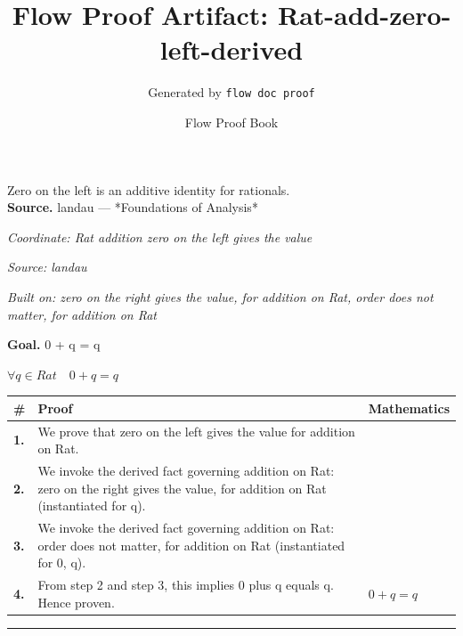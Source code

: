 \documentclass[11pt]{article}
\title{Flow Proof Artifact: Rat-add-zero-left-derived}
\author{Generated by \texttt{flow doc proof}}
\date{Flow Proof Book}
\theoremstyle{definition}
\begin{document}
\maketitle
Zero on the left is an additive identity for rationals.\\[0.5em]
\textbf{Source.} landau — *Foundations of Analysis*\\[0.5em]
\bigskip
{}\par
\smallskip\noindent\textit{Coordinate: Rat \cdot addition \cdot zero on the left gives the value}\par
\smallskip\noindent\textit{Source: landau}\par
\smallskip\noindent\textit{Built on: zero on the right gives the value, for addition on Rat, order does not matter, for addition on Rat}\par
\medskip
\noindent\textbf{Goal.} 0 + q = q\par
\noindent$\displaystyle \forall q \in Rat\quad 0 + q = q$\par
\medskip
\noindent
\begin{tabular}{@{} >{\raggedright\arraybackslash}p{} >{\raggedright\arraybackslash}p{} >{\raggedleft\arraybackslash}p{} @{}}
\textbf{\#} & \textbf{Proof} & \textbf{Mathematics} \\
\midrule
\textbf{1.} & We prove that zero on the left gives the value for addition on Rat. & \\[0.45em]
\textbf{2.} & We invoke the derived fact governing addition on Rat: zero on the right gives the value, for addition on Rat (instantiated for q). & \\[0.45em]
\textbf{3.} & We invoke the derived fact governing addition on Rat: order does not matter, for addition on Rat (instantiated for 0, q). & \\[0.45em]
\textbf{4.} & From step 2 and step 3, this implies 0 plus q equals q. Hence proven. & $\displaystyle 0 + q = q$ \\[0.45em]
\bottomrule
\end{tabular}
\label{thm:Rat-addition-zero_on_the_left_gives_the_value}
\par\medskip\hrule
\end{document}
